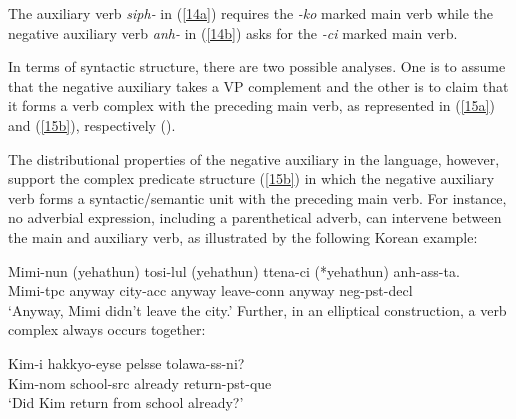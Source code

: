 \documentclass[output=paper]{langsci/langscibook}
\begin{document}
{The auxiliary verb {\it siph-} in (\ref{14a}) requires the
{\it -ko} marked main verb while the negative auxiliary
 verb {\it anh-} in (\ref{14b}) asks for the {\it -ci} marked main verb.




In terms of syntactic structure, there
are two possible analyses.  One is to assume that the negative auxiliary
takes
a VP complement and the other is to claim that it forms a verb complex
with the preceding main verb, as
represented in (\ref{15a}) and (\ref{15b}), respectively (\citep{Kim:16}).

\eal
\ex \label{15a}

\ex \label{15b}
\zl


\noindent The distributional properties of
 the negative auxiliary in the language, however, support
 the complex predicate structure (\ref{15b}) in which the negative auxiliary verb
forms a syntactic/semantic unit with the preceding main verb.
For instance, no adverbial expression, including
a parenthetical adverb, can intervene between
the main and auxiliary verb, as illustrated by the
following Korean example:

\ea
\gll Mimi-nun (yehathun) tosi-lul (yehathun) ttena-ci (*yehathun) anh-ass-ta. \\
     Mimi-{\sc tpc} anyway city-{\sc acc} anyway leave-{\sc conn} anyway {\sc neg}-{\sc pst}-{\sc decl} \\
\glt `Anyway, Mimi didn't leave the city.'
\z
%
Further, in an elliptical construction, a verb
complex always occurs together:



\eal\ex \gll Kim-i hakkyo-eyse pelsse tolawa-ss-ni? \\
Kim-{\sc nom} school-{\sc src} already return-{\sc pst}-{\sc que} \\
`Did Kim return from school already?'

}
\end{document}
